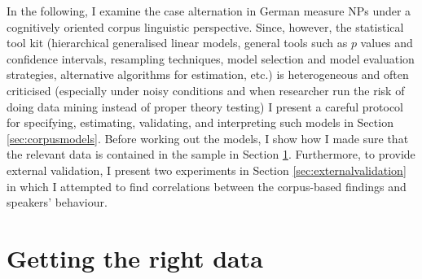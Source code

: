\documentclass[USenglish]{article}
\begin{document}
In the following, I examine the case alternation in German measure NPs under a cognitively oriented corpus linguistic perspective.
Since, however, the statistical tool kit (hierarchical generalised linear models, general tools such as $p$ values and confidence intervals, resampling techniques, model selection and model evaluation strategies, alternative algorithms for estimation, etc.) is heterogeneous and often criticised (especially under noisy conditions and when researcher run the risk of doing data mining instead of proper theory testing) I present a careful protocol for specifying, estimating, validating, and interpreting such models in Section \ref{sec:corpusmodels}.
Before working out the models, I show how I made sure that the relevant data is contained in the sample in Section \ref{sec:gettingdata}.
Furthermore, to provide external validation, I present two experiments in Section \ref{sec:externalvalidation} in which I attempted to find correlations between the corpus-based findings and speakers' behaviour.

\section{Getting the right data}
\label{sec:gettingdata}

\end{document}
